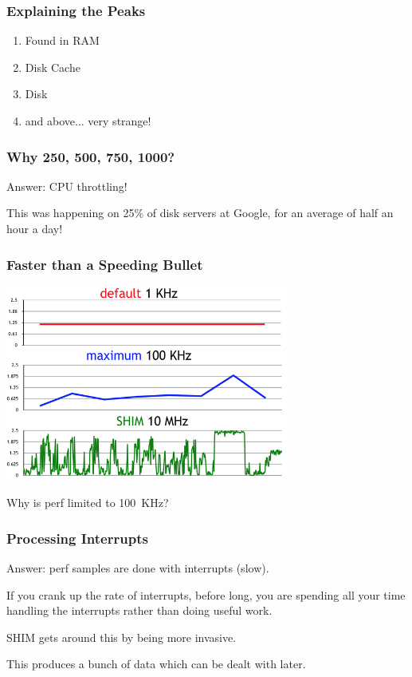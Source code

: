 \begin{frame}
\frametitle{Explaining the Peaks}

\begin{enumerate}
	\item Found in RAM
	\item Disk Cache
	\item Disk
	\item and above... very strange!
\end{enumerate}

\end{frame}



\begin{frame}
\frametitle{Why 250, 500, 750, 1000?}

Answer: CPU throttling!

This was happening on 25\% of disk servers at Google, for an average of half an hour a day!

\end{frame}



\begin{frame}
\frametitle{Faster than a Speeding Bullet}

\begin{center}
	\includegraphics[width=0.7\textwidth]{images/perf-sample.png}
\end{center}

Why is perf limited to 100~KHz?

\end{frame}



\begin{frame}
\frametitle{Processing Interrupts}

Answer: perf samples are done with interrupts (slow). 

If you crank up the rate of interrupts, before long, you are spending all your time handling the interrupts rather than doing useful work.

SHIM gets around this by being more invasive.

This produces a bunch of data which can be dealt with later.

\end{frame}




